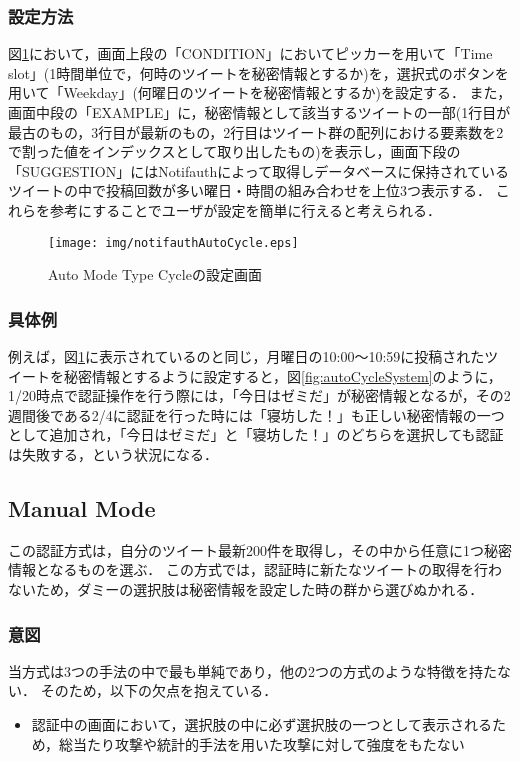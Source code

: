 \subsubsection{設定方法}
図\ref{fig:notifauthAutoCycle}において，画面上段の「CONDITION」においてピッカーを用いて「Time slot」(1時間単位で，何時のツイートを秘密情報とするか)を，選択式のボタンを用いて「Weekday」(何曜日のツイートを秘密情報とするか)を設定する．
また，画面中段の「EXAMPLE」に，秘密情報として該当するツイートの一部(1行目が最古のもの，3行目が最新のもの，2行目はツイート群の配列における要素数を2で割った値をインデックスとして取り出したもの)を表示し，画面下段の「SUGGESTION」にはNotifauthによって取得しデータベースに保持されているツイートの中で投稿回数が多い曜日・時間の組み合わせを上位3つ表示する．
これらを参考にすることでユーザが設定を簡単に行えると考えられる．

\begin{figure}[ht]
  \begin{center}
    \texttt{[image: img/notifauthAutoCycle.eps]}
  \end{center}
  \caption{Auto Mode Type Cycleの設定画面}
  \label{fig:notifauthAutoCycle}
\end{figure}

\subsubsection{具体例}
例えば，図\ref{fig:notifauthAutoCycle}に表示されているのと同じ，月曜日の10:00〜10:59に投稿されたツイートを秘密情報とするように設定すると，図\ref{fig:autoCycleSystem}のように，1/20時点で認証操作を行う際には，「今日はゼミだ」が秘密情報となるが，その2週間後である2/4に認証を行った時には「寝坊した！」も正しい秘密情報の一つとして追加され，「今日はゼミだ」と「寝坊した！」のどちらを選択しても認証は失敗する，という状況になる．

\subsection{Manual Mode}
この認証方式は，自分のツイート最新200件を取得し，その中から任意に1つ秘密情報となるものを選ぶ．
この方式では，認証時に新たなツイートの取得を行わないため，ダミーの選択肢は秘密情報を設定した時の群から選びぬかれる．

\subsubsection{意図}
当方式は3つの手法の中で最も単純であり，他の2つの方式のような特徴を持たない．
そのため，以下の欠点を抱えている．
\begin{itemize}
  \item 認証中の画面において，選択肢の中に必ず選択肢の一つとして表示されるため，総当たり攻撃や統計的手法を用いた攻撃に対して強度をもたない
\end{itemize}

